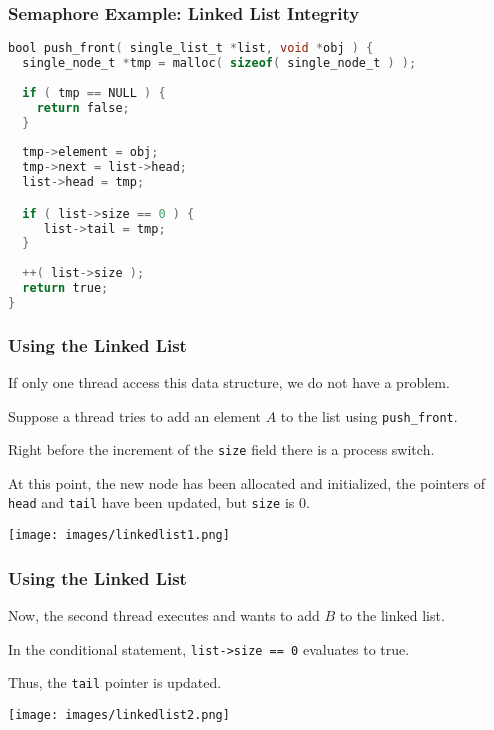 \begin{frame}[fragile]
	\frametitle{Semaphore Example: Linked List Integrity}

	\begin{lstlisting}[language=C]
bool push_front( single_list_t *list, void *obj ) {
  single_node_t *tmp = malloc( sizeof( single_node_t ) );
  
  if ( tmp == NULL ) {
    return false;
  }
  
  tmp->element = obj;
  tmp->next = list->head;
  list->head = tmp;

  if ( list->size == 0 ) {
     list->tail = tmp;
  }
  
  ++( list->size );
  return true;
}
	\end{lstlisting}
\end{frame}


\begin{frame}
	\frametitle{Using the Linked List}

	If only one thread access this data structure, we do not have a problem.

	Suppose a thread tries to add an element $A$ to the list using \texttt{push\_front}.

	Right before the increment of the \texttt{size} field there is a process switch.

	At this point, the new node has been allocated and initialized, the pointers of \texttt{head} and \texttt{tail} have been updated, but \texttt{size} is 0.

	\begin{center}
		\texttt{[image: images/linkedlist1.png]}
	\end{center}

\end{frame}

\begin{frame}
	\frametitle{Using the Linked List}

	Now, the second thread executes and wants to add $B$ to the linked list.

	In the conditional statement, \texttt{list->size == 0} evaluates to true.

	Thus, the \texttt{tail} pointer is updated.

	\begin{center}
		\texttt{[image: images/linkedlist2.png]}
	\end{center}


\end{frame}

